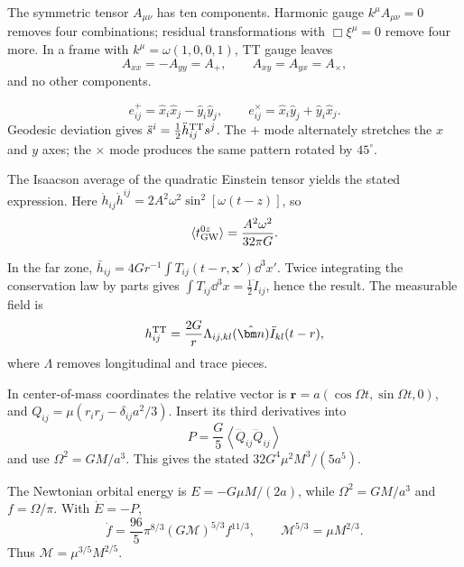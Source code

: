 \begin{exercises}


\end{exercises}

\begin{solutions}

\begin{solution}
The symmetric tensor \(A_{\mu\nu}\) has ten components.  Harmonic gauge
\(k^\mu A_{\mu\nu}=0\) removes four combinations; residual transformations
with \(\Box\xi^\mu=0\) remove four more.  In a frame with
\(k^\mu=\omega(1,0,0,1)\), TT gauge leaves
\[
A_{xx}=-A_{yy}=A_+,\qquad A_{xy}=A_{yx}=A_\times,
\]
and no other components.
\end{solution}

\begin{solution}
\[
e^+_{ij}=\hat x_i\hat x_j-\hat y_i\hat y_j,\qquad
e^\times_{ij}=\hat x_i\hat y_j+\hat y_i\hat x_j.
\]
Geodesic deviation gives
\(\ddot s^i=\tfrac12\ddot h^{\rm TT}_{ij}s^j\).
The \(+\) mode alternately stretches the \(x\) and \(y\) axes; the
\(\times\) mode produces the same pattern rotated by \(45^\circ\).
\end{solution}

\begin{solution}
The Isaacson average of the quadratic Einstein tensor yields the stated
expression.  Here
\(\dot h_{ij}\dot h^{ij}=2A^2\omega^2\sin^2[\omega(t-z)]\), so
\[
\langle t^{0z}_{\rm GW}\rangle
=\frac{A^2\omega^2}{32\pi G}.
\]
\end{solution}

\begin{solution}
In the far zone,
\(\bar h_{ij}=4G r^{-1}\int T_{ij}(t-r,\bm x')\dd^3x'\).
Twice integrating the conservation law by parts gives
\(\int T_{ij}\dd^3x=\tfrac12\ddot I_{ij}\), hence the result.  The measurable
field is
\[
h^{\rm TT}_{ij}=\frac{2G}{r}
\Lambda_{ij,kl}(\hat{\bm n})\ddot I_{kl}(t-r),
\]
where \(\Lambda\) removes longitudinal and trace pieces.
\end{solution}

\begin{solution}
In center-of-mass coordinates the relative vector is
\(\bm r=a(\cos\Omega t,\sin\Omega t,0)\), and
\(Q_{ij}=\mu(r_ir_j-\delta_{ij}a^2/3)\).  Insert its third derivatives into
\[
P=\frac{G}{5}\left\langle\dddot Q_{ij}\dddot Q_{ij}\right\rangle
\]
and use \(\Omega^2=GM/a^3\).  This gives the stated
\(32G^4\mu^2M^3/(5a^5)\).
\end{solution}

\begin{solution}
The Newtonian orbital energy is
\(E=-G\mu M/(2a)\), while
\(\Omega^2=GM/a^3\) and \(f=\Omega/\pi\).  With \(\dot E=-P\),
\[
\dot f=\frac{96}{5}\pi^{8/3}
(G\mathcal M)^{5/3}f^{11/3},
\qquad
\mathcal M^{5/3}=\mu M^{2/3}.
\]
Thus \(\mathcal M=\mu^{3/5}M^{2/5}\).
\end{solution}


\end{solutions}
